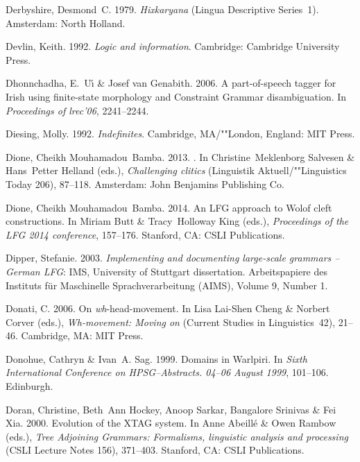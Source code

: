 \begin{thebibliography}{1420}
Derbyshire, Desmond~C. 1979.
\newblock \emph{Hixkaryana} (Lingua Descriptive Series~1).
\newblock Amsterdam: North Holland.

Devlin, Keith. 1992.
\newblock \emph{Logic and information}.
\newblock Cambridge: Cambridge University Press.

Dhonnchadha, E.~U{\'\i} \& Josef van Genabith. 2006.
\newblock A part-of-speech tagger for {Irish} using finite-state morphology and
  {Constraint Grammar} disambiguation.
\newblock In \emph{Proceedings of lrec'06}, 2241--2244.

Diesing, Molly. 1992.
\newblock \emph{Indefinites}.
\newblock Cambridge, MA/""London, England: MIT Press.

Dione, Cheikh Mouhamadou~Bamba. 2013.
.
\newblock In Christine~Meklenborg Salvesen \& Hans~Petter Helland (eds.),
  \emph{Challenging clitics} (Linguistik Aktuell/""Linguistics Today 206),
  87--118. Amsterdam: John Benjamins Publishing Co.

Dione, Cheikh Mouhamadou~Bamba. 2014.
\newblock An {LFG} approach to {Wolof} cleft constructions.
\newblock In Miriam Butt \& Tracy~Holloway King (eds.), \emph{Proceedings of
  the {LFG 2014} conference}, 157--176. Stanford, CA: CSLI Publications.

Dipper, Stefanie. 2003.
\newblock \emph{Implementing and documenting large-scale grammars -- {German
  LFG}}: IMS, University of Stuttgart dissertation.
\newblock Arbeitspapiere des Instituts f{\"u}r Maschinelle Sprachverarbeitung
  (AIMS), Volume 9, Number 1.

Donati, C. 2006.
\newblock On \emph{wh}-head-movement.
\newblock In Lisa Lai-Shen Cheng \& Norbert Corver (eds.),
  \emph{\emph{Wh}-movement: {Moving} on} (Current Studies in Linguistics~42),
  21--46. Cambridge, MA: MIT Press.

Donohue, Cathryn \& Ivan~A. Sag. 1999.
\newblock Domains in {Warlpiri}.
\newblock In \emph{{Sixth International Conference on {HPSG}--{Abstracts}.
  04--06 August 1999}}, 101--106. Edinburgh.

Doran, Christine, Beth~Ann Hockey, Anoop Sarkar, Bangalore Srinivas \& Fei Xia.
  2000.
\newblock Evolution of the {XTAG} system.
\newblock In Anne Abeill{\'e} \& Owen Rambow (eds.), \emph{{Tree Adjoining
  Grammars}: Formalisms, linguistic analysis and processing} (CSLI Lecture
  Notes 156), 371--403. Stanford, CA: CSLI Publications.


\end{thebibliography}
